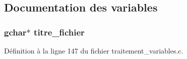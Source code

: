\subsection{Documentation des variables}
\subsubsection[{titre\_\-fichier}]{\setlength{\rightskip}{0pt plus 5cm}gchar$\ast$ {\bf titre\_\-fichier}}\label{export_8c_a787cc81cf2ad728775b73d723713980b}


Définition à la ligne 147 du fichier traitement\_\-variables.c.

